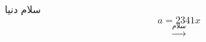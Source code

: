 \documentclass{article}
\begin{document}
	سلام دنیا 
	$$a = 2341x$$
	$$\xrightarrow{\text{سلام}} $$
\end{document}
